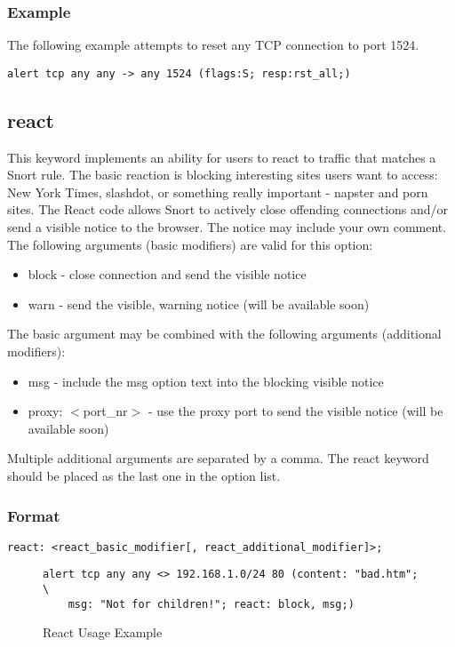 \documentclass[english]{report}
\begin{document}
\subsubsection{Example}

The following example attempts to reset any TCP connection to port 1524.
\begin{verbatim}
alert tcp any any -> any 1524 (flags:S; resp:rst_all;)
\end{verbatim}


\subsection{react}

This keyword implements an ability for users to react to traffic that
matches a Snort rule. The basic reaction is blocking interesting sites
users want to access: New York Times, slashdot, or something really
important - napster and porn sites. The React code allows Snort to
actively close offending connections and/or send a visible notice to the
browser. The notice may include your own comment. The following arguments
(basic modifiers) are valid for this option:

\begin{itemize}
\item block - close connection and send the visible notice 
\item warn - send the visible, warning notice (will be available soon) 
\end{itemize}
The basic argument may be combined with the following arguments (additional
modifiers): 

\begin{itemize}
\item msg - include the msg option text into the blocking visible notice 
\item proxy: $<$port\_nr$>$ - use the proxy port to send the visible notice
(will be available soon)
\end{itemize}
Multiple additional arguments are separated by a comma. The react
keyword should be placed as the last one in the option list.


\subsubsection{Format}

\begin{verbatim}
react: <react_basic_modifier[, react_additional_modifier]>;
\end{verbatim}
%
\begin{figure}[!hbpt]
\begin{verbatim}
alert tcp any any <> 192.168.1.0/24 80 (content: "bad.htm"; \
    msg: "Not for children!"; react: block, msg;) 
\end{verbatim}
\caption{\label{react examples}React Usage Example}
\end{figure}
\end{document}
